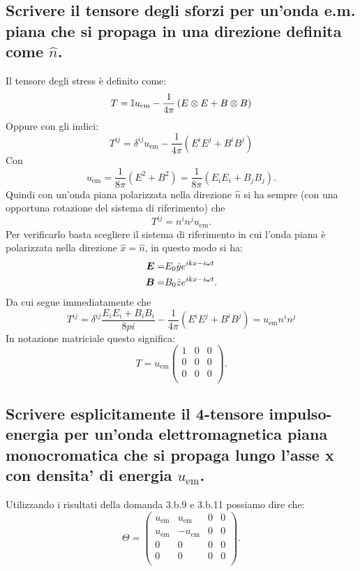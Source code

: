 \subsection[]{Scrivere il tensore degli sforzi per un’onda e.m. piana che si propaga in una direzione definita come $\hat{n}$.}
\label{sec:3.b.11}
Il tensore degli stress è definito come:
\[
	T= \mathbb{I} u_{\text{em}} - \frac{1}{4\pi} \left( E \otimes E + B \otimes B\right) 
\]
Oppure con gli indici:
\[
	T^{ij}= \delta^{ij}u_{\text{em}} - \frac{1}{4\pi}\left( E^{i}E^{j}+ B^{i}B^{j} \right) 
\]
Con 
\[
	u_{\text{em}}=\frac{1}{8\pi}\left( E^2 + B^2 \right) = \frac{1}{8\pi}\left( E_{i}E_{i}+ B_{j}B_{j} \right)
.\]
Quindi con un'onda piana polarizzata nella direzione $\hat{n}$ si ha sempre (con una opportuna rotazione del sistema di riferimento) che \[
	T^{ij}=n^{i}n^{j}u_{\text{em}}
.\] 
Per verificarlo basta scegliere il sistema di riferimento in cui l'onda piana è polarizzata nella direzione $\hat{x}=\hat{n}$, in questo modo si ha:
\begin{align*}
	\boldsymbol{E}=&E_0 \hat{y} e^{ikx-i \omega t}\\
	\boldsymbol{B}=&B_0 \hat{z} e^{ikx-i\omega t}
.\end{align*}
Da cui segue immediatamente che \[
	T^{ij}= \delta^{ij} \frac{E_{i}E_{i}+B_{i}B_{i}}{8 pi} - \frac{1}{4\pi}\left(  E^{i}E^{j}+B^{i}B^{j}\right)= u_{\text{em}}n^{i}n^{j}
\]
In notazione matriciale questo significa:
\[
	T=
	u_{\text{em}}
	\left(
	\begin{array}{ccc}
		1 & 0 & 0 \\   
		0 & 0 & 0 \\
		0 & 0 & 0 \\
	\end{array}
	\right)
.\] 
\subsection[]{Scrivere esplicitamente il 4-tensore impulso-energia per un’onda elettromagnetica piana monocromatica che si propaga lungo l’asse x con densita’ di energia $u_{\text{em}}$.}
\label{sec:3.b.12}
Utilizzando i risultati della domanda 3.b.9 e 3.b.11 possiamo dire che:
\[
\Theta=
\left(
\begin{array}{cccc}
	u_{\text{em}} & u_{\text{em}}  & 0 & 0 \\   
	u_{\text{em}} & -u_{\text{em}} & 0 & 0 \\
	0 & 0 & 0 & 0 \\
	0 & 0 & 0 & 0 \\
\end{array}
\right)
.\] 


